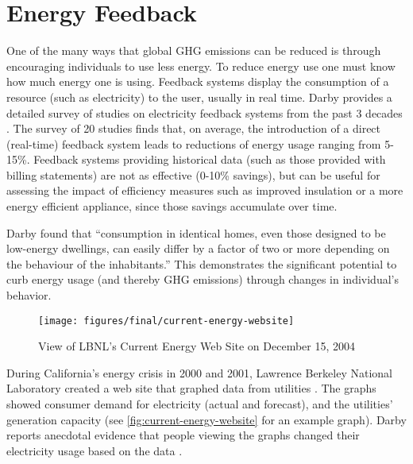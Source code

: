 \section{Energy Feedback}

One of the many ways that global GHG emissions can be reduced is through encouraging individuals to use less energy. To reduce energy use one must know how much energy one is using. Feedback systems display the consumption of a resource (such as electricity) to the user, usually in real time. Darby provides a detailed survey of studies on electricity feedback systems from the past 3 decades \cite{darby-review-2006}. The survey of 20 studies finds that, on average, the introduction of a direct (real-time) feedback system leads to reductions of energy usage ranging from 5-15\%. Feedback systems providing historical data (such as those provided with billing statements) are not as effective (0-10\% savings), but can be useful for assessing the impact of efficiency measures such as improved insulation or a more energy efficient appliance, since those savings accumulate over time.

Darby found that ``consumption in identical homes, even those designed to be low-energy dwellings, can easily differ by a factor of two or more depending on the behaviour of the inhabitants.'' This demonstrates the significant potential to curb energy usage (and thereby GHG emissions) through changes in individual's behavior.

\begin{figure}[htbp]
	\begin{center}
		\texttt{[image: figures/final/current-energy-website]}
		\caption{View of LBNL's Current Energy Web Site on December 15, 2004}
		\label{fig:current-energy-website}
 	\end{center}
\end{figure}

During California's energy crisis in 2000 and 2001, Lawrence Berkeley National Laboratory created a web site that graphed data from utilities \cite{Bartholomew2008Current-Energy}. The graphs showed consumer demand for electricity (actual and forecast), and the utilities' generation capacity (see \autoref{fig:current-energy-website} for an example graph). Darby reports anecdotal evidence that people viewing the graphs changed their electricity usage based on the data \cite{darby-review-2006}.

